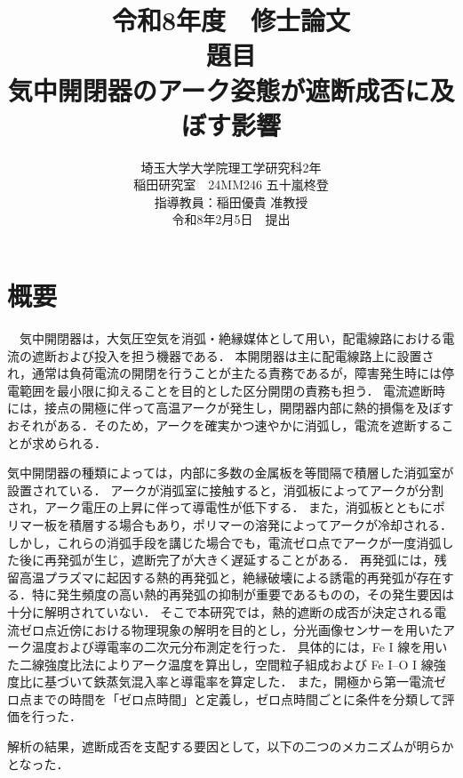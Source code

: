 \documentclass[dvipdfmx,report,uplatex]{jsbook}
\numberwithin{equation}{section}
\numberwithin{figure}{section}
\numberwithin{table}{section}
\begin{document}
\pagestyle{empty}
\title{令和8年度　修士論文\\[2cm]題目\\[1cm]\huge{気中開閉器のアーク姿態が遮断成否に及ぼす影響}\\[5cm]}
\author{%
  埼玉大学大学院理工学研究科2年\\
  稲田研究室　24MM246 五十嵐柊登\\
  指導教員：稲田優貴 准教授\\[2cm]
  令和8年2月5日　提出}
\date{}
\maketitle
\clearpage

\newpage
\chapter*{概要}
　気中開閉器は，大気圧空気を消弧・絶縁媒体として用い，配電線路における電流の遮断および投入を担う機器である．
本開閉器は主に配電線路上に設置され，通常は負荷電流の開閉を行うことが主たる責務であるが，障害発生時には停電範囲を最小限に抑えることを目的とした区分開閉の責務も担う．
電流遮断時には，接点の開極に伴って高温アークが発生し，開閉器内部に熱的損傷を及ぼすおそれがある．そのため，アークを確実かつ速やかに消弧し，電流を遮断することが求められる．

気中開閉器の種類によっては，内部に多数の金属板を等間隔で積層した消弧室が設置されている．
アークが消弧室に接触すると，消弧板によってアークが分割され，アーク電圧の上昇に伴って導電性が低下する．
また，消弧板とともにポリマー板を積層する場合もあり，ポリマーの溶発によってアークが冷却される．
しかし，これらの消弧手段を講じた場合でも，電流ゼロ点でアークが一度消弧した後に再発弧が生じ，遮断完了が大きく遅延することがある．
再発弧には，残留高温プラズマに起因する熱的再発弧と，絶縁破壊による誘電的再発弧が存在する．特に発生頻度の高い熱的再発弧の抑制が重要であるものの，その発生要因は十分に解明されていない．
そこで本研究では，熱的遮断の成否が決定される電流ゼロ点近傍における物理現象の解明を目的とし，分光画像センサーを用いたアーク温度および導電率の二次元分布測定を行った．
具体的には，Fe I 線を用いた二線強度比法によりアーク温度を算出し，空間粒子組成および Fe I–O I 線強度比に基づいて鉄蒸気混入率と導電率を算定した．
また，開極から第一電流ゼロ点までの時間を「ゼロ点時間」と定義し，ゼロ点時間ごとに条件を分類して評価を行った．

解析の結果，遮断成否を支配する要因として，以下の二つのメカニズムが明らかとなった．
\end{document}
